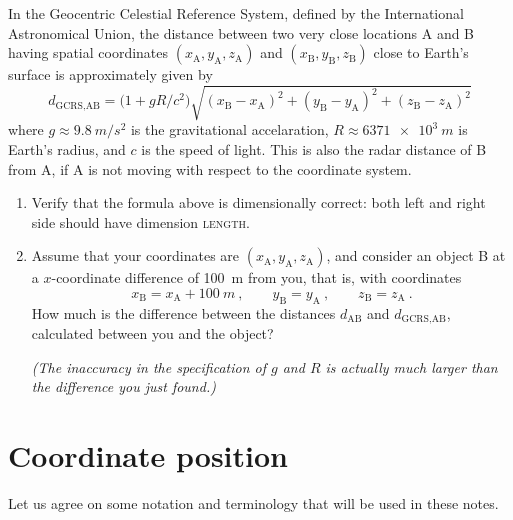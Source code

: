 \documentclass[a4paper,12pt,%
onecolumn,oneside,%
british%
]{memoir}
\renewcommand*{\|}[1][]{\nonscript\:#1\vert\nonscript\:\mathopen{}}
\newcommand*{\yc}{c} %
\begin{document}
\begin{exercise}
  In the Geocentric Celestial Reference System, defined by the International Astronomical Union, the distance between two very close locations A and B having spatial coordinates $(x_{\textrm{A}}, y_{\textrm{A}}, z_{\textrm{A}})$ and $(x_{\textrm{B}}, y_{\textrm{B}}, z_{\textrm{B}})$ close to Earth's surface is approximately given by
\begin{equation}
  \label{eq:distance_GCRS}
  d_{\textrm{GCRS},\textrm{A}\textrm{B}} = \bigl(1 + g R/\yc^{2}\bigr)
  \sqrt{
    (x_{\textrm{B}} - x_{\textrm{A}})^{2} +
    (y_{\textrm{B}} - y_{\textrm{A}})^{2} +
    (z_{\textrm{B}} - z_{\textrm{A}})^{2}
  }
\end{equation}
where $g \approx \qty{9.8}{m/s^{2}}$ is the gravitational accelaration, $R \approx \qty{6371e3}{m}$ is Earth's radius, and $\yc$ is the speed of light. This is also the radar distance of B from A, if A is not moving with respect to the coordinate system.
\begin{enumerate}[exerc]
\item Verify that the formula above is dimensionally correct: both left and right side should have dimension \textsc{length}.
\item Assume that your coordinates are $(x_{\textrm{A}}, y_{\textrm{A}}, z_{\textrm{A}})$, and consider an object B at a $x$-coordinate difference of \qty{100}{m} from you, that is, with coordinates
  \begin{equation*}
    x_{\textrm{B}} = x_{\textrm{A}} + \qty{100}{m}
    \ ,\qquad
    y_{\textrm{B}} = y_{\textrm{A}}
    \ ,\qquad
    z_{\textrm{B}} = z_{\textrm{A}} \ .
  \end{equation*}
  How much is the difference between the distances $d_{\textrm{A}\textrm{B}}$ and $d_{\textrm{GCRS},\textrm{A}\textrm{B}}$, calculated between you and the object?

  \emph{(The inaccuracy in the specification of $g$ and $R$ is actually much larger than the difference you just found.)}
\end{enumerate}
\end{exercise}

\section{Coordinate position}
\label{sec:position_vector}

Let us agree on some notation and terminology that will be used in these notes.
\end{document}
